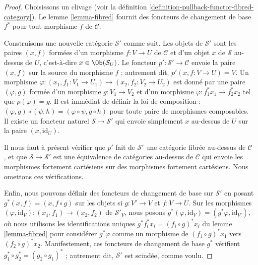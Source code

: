 \begin{proof}
Choisissons un clivage (voir la
définition \ref{definition-pullback-functor-fibred-category}).
Le lemme \ref{lemma-fibred} fournit des foncteurs de changement de base $f^*$ pour
tout morphisme $f$ de $\mathcal{C}$.

\medskip\noindent
Construisons une nouvelle catégorie $\mathcal{S}'$ comme suit.
Les objets de $\mathcal{S}'$ sont les paires $(x, f)$
formées d'un morphisme $f : V \to U$ de $\mathcal{C}$
et d'un objet $x$ de $\mathcal{S}$ au-dessus de $U$, c'est-à-dire
$x\in \Ob(\mathcal{S}_U)$. Le foncteur
$p' : \mathcal{S}' \to \mathcal{C}$ envoie la paire $(x, f)$ sur la source
du morphisme $f$ ; autrement dit, $p'(x, f : V\to U) = V$. Un morphisme
$\varphi : (x_1, f_1: V_1 \to U_1) \to (x_2, f_2 : V_2 \to U_2)$ est donné par une
paire $(\varphi, g)$ formée d'un morphisme $g : V_1 \to V_2$ et d'un morphisme
$\varphi : f_1^\ast x_1 \to f_2^\ast x_2$ tel que $p(\varphi) = g$. Il est
immédiat de définir la loi de composition : $(\varphi, g) \circ (\psi, h) =
(\varphi \circ \psi, g\circ h)$ pour toute paire de morphismes composables.
Il existe un foncteur naturel $\mathcal{S} \to \mathcal{S}'$ qui envoie simplement
$x$ au-dessus de $U$ sur la paire $(x, \text{id}_U)$.

\medskip\noindent
Il nous faut à présent vérifier que $p'$ fait de $\mathcal{S}'$ une
catégorie fibrée au-dessus de $\mathcal{C}$, et que
$\mathcal{S} \to \mathcal{S}'$ est une équivalence de catégories au-dessus de
$\mathcal{C}$ qui envoie les morphismes fortement cartésiens sur des morphismes fortement
cartésiens. Nous omettons ces vérifications.

\medskip\noindent
Enfin, nous pouvons définir des foncteurs de changement de base sur $\mathcal{S}'$
en posant $g^\ast(x, f) = (x, f \circ g)$ sur les objets si
$g : V' \to V$ et $f : V \to U$. Sur les morphismes
$(\varphi, \text{id}_V) : (x_1, f_1) \to (x_2, f_2)$
de $\mathcal{S}'_V$, nous posons $g^\ast(\varphi, \text{id}_V) =
(g^\ast\varphi, \text{id}_{V'})$, où nous utilisons les identifications uniques
$g^\ast f_i^\ast x_i = (f_i \circ g)^\ast x_i$ du lemme
\ref{lemma-fibred} pour considérer $g^\ast\varphi$ comme un morphisme de
$(f_1 \circ g)^\ast x_1$ vers $(f_2 \circ g)^\ast x_2$. Manifestement, ces foncteurs
de changement de base $g^\ast$ vérifient
$g_1^\ast \circ g_2^\ast = (g_2\circ g_1)^\ast$ ; autrement dit, $\mathcal{S}'$
est scindée, comme voulu.
\end{proof}



















